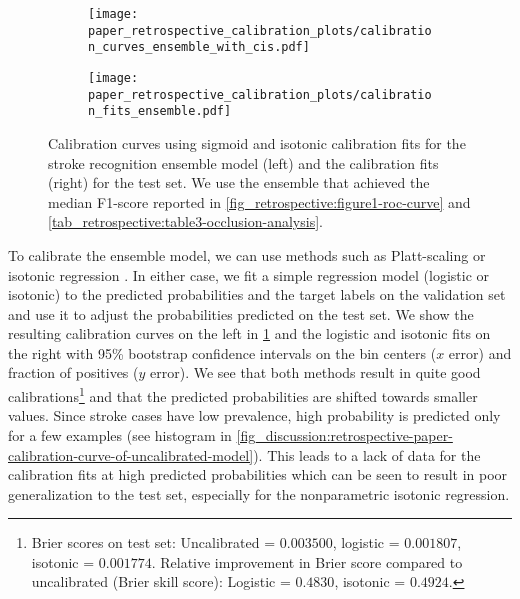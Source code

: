 \begin{figure}
    \centering
    \begin{subfigure}[c]{0.49\columnwidth}
        \centering
        \texttt{[image: paper\_retrospective\_calibration\_plots/calibration\_curves\_ensemble\_with\_cis.pdf]}
    \end{subfigure}
    \hfill
    \begin{subfigure}[c]{0.49\columnwidth}
        \centering
        \texttt{[image: paper\_retrospective\_calibration\_plots/calibration\_fits\_ensemble.pdf]}
    \end{subfigure}    
    \caption[Calibration fits and curves for the stroke recognition ensemble using Platt-scaling and isotonic regression for calibration.]{ Calibration curves using sigmoid and isotonic calibration fits for the stroke recognition ensemble model (left) and the calibration fits (right) for the test set. We use the ensemble that achieved the median F1-score reported in \cref{fig_retrospective:figure1-roc-curve} and \cref{tab_retrospective:table3-occlusion-analysis}.}
    \label{fig_discussion:retrospective-paper-calibration-curve-sigmoid-isotonic}
\end{figure}

To calibrate the ensemble model, we can use methods such as Platt-scaling \parencite{platt_probabilistic_1999} or isotonic regression \parencite{zadrozny_transforming_2002}. 
In either case, we fit a simple regression model (logistic or isotonic) to the predicted probabilities and the target labels on the validation set and use it to adjust the probabilities predicted on the test set. We show the resulting calibration curves on the left in \cref{fig_discussion:retrospective-paper-calibration-curve-sigmoid-isotonic} and the logistic and isotonic fits on the right with 95\% bootstrap confidence intervals on the bin centers ($x$ error) and fraction of positives ($y$ error). 
We see that both methods result in quite good calibrations\footnote{Brier scores on test set: Uncalibrated = $0.003500$, logistic = $0.001807$, isotonic = $0.001774$. Relative improvement in Brier score compared to uncalibrated (Brier skill score): Logistic = $0.4830$, isotonic = $0.4924$.} and that the predicted probabilities are shifted towards smaller values. 
Since stroke cases have low prevalence, high probability is predicted only for a few examples (see histogram in \cref{fig_discussion:retrospective-paper-calibration-curve-of-uncalibrated-model}). This leads to a lack of data for the calibration fits at high predicted probabilities which can be seen to result in poor generalization to the test set, especially for the nonparametric isotonic regression.

